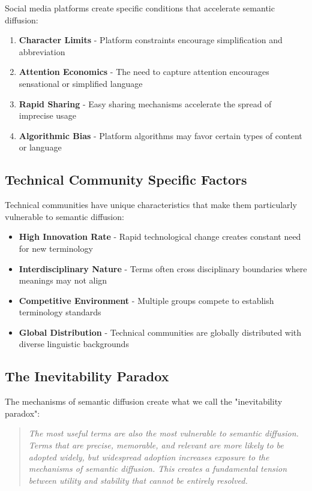 \documentclass[11pt]{article}
\begin{document}
Social media platforms create specific conditions that accelerate semantic diffusion:

\begin{enumerate}
\item \textbf{Character Limits} - Platform constraints encourage simplification and abbreviation
\item \textbf{Attention Economics} - The need to capture attention encourages sensational or simplified language
\item \textbf{Rapid Sharing} - Easy sharing mechanisms accelerate the spread of imprecise usage
\item \textbf{Algorithmic Bias} - Platform algorithms may favor certain types of content or language
\end{enumerate}

\subsection{Technical Community Specific Factors}

Technical communities have unique characteristics that make them particularly vulnerable to semantic diffusion:

\begin{itemize}
\item \textbf{High Innovation Rate} - Rapid technological change creates constant need for new terminology
\item \textbf{Interdisciplinary Nature} - Terms often cross disciplinary boundaries where meanings may not align
\item \textbf{Competitive Environment} - Multiple groups compete to establish terminology standards
\item \textbf{Global Distribution} - Technical communities are globally distributed with diverse linguistic backgrounds
\end{itemize}

\subsection{The Inevitability Paradox}

The mechanisms of semantic diffusion create what we call the "inevitability paradox":

\begin{quote}
\emph{The most useful terms are also the most vulnerable to semantic diffusion. Terms that are precise, memorable, and relevant are more likely to be adopted widely, but widespread adoption increases exposure to the mechanisms of semantic diffusion. This creates a fundamental tension between utility and stability that cannot be entirely resolved.}
\end{quote}
\end{document}
